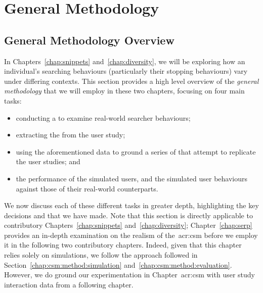 
\chapter[General Methodology]{General Methodology}\label{chap:method}

\section{General Methodology Overview}\label{sec:csm:methodology}
In Chapters~\ref{chap:snippets} and~\ref{chap:diversity}, we will be exploring how an individual's searching behaviours (particularly their stopping behaviours) vary under differing contexts. This section provides a high level overview of the \emph{general methodology} that we will employ in these two chapters, focusing on four main tasks:

\begin{itemize}
    \item{conducting a  to examine real-world searcher behaviours;}
    \item{extracting the  from the user study;}
    \item{using the aforementioned data to ground a series of  that attempt to replicate the user studies; and}
    \item{ the performance of the simulated users, and  the simulated user behaviours against those of their real-world counterparts.}
\end{itemize}

We now discuss each of these different tasks in greater depth, highlighting the key decisions and  that we have made. Note that this section is directly applicable to contributory Chapters~\ref{chap:snippets} and~\ref{chap:diversity}; Chapter~\ref{chap:serp} provides an in-depth examination on the realism of the~\gls{acr:csm} before we employ it in the following two contributory chapters. Indeed, given that this chapter relies solely on simulations, we follow the approach followed in Section~\ref{chap:csm:method:simulation} and~\ref{chap:csm:method:evaluation}. However, we do ground our experimentation in Chapter~\gls{acr:csm} with user study interaction data from a following chapter.

